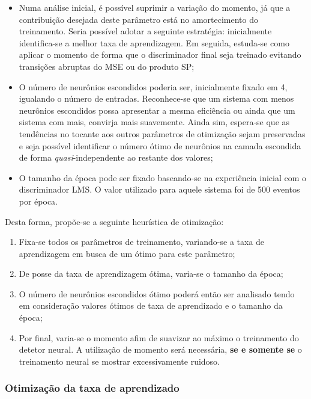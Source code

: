 \begin{itemize}
\item Numa análise inicial, é possível suprimir a variação do momento, já que
a contribuição desejada deste parâmetro está no amortecimento do
treinamento. Seria possível adotar a seguinte estratégia: inicialmente
identifica-se a melhor taxa de aprendizagem. Em seguida, estuda-se como
aplicar o momento de forma que o discriminador final seja treinado evitando
transições abruptas do MSE ou do produto SP;

\item O número de neurônios escondidos poderia ser, inicialmente fixado em 4,
igualando o número de entradas. Reconhece-se que um sistema com menos
neurônios escondidos possa apresentar a mesma eficiência ou ainda que um
sistema com mais, convirja mais suavemente. Ainda sim, espera-se que as
tendências no tocante aos outros parâmetros de otimização sejam preservadas e
seja possível identificar o número ótimo de neurônios na camada escondida de
forma \textit{quasi}-independente ao restante dos valores;

\item O tamanho da época pode ser fixado baseando-se na experiência inicial
com o discriminador LMS. O valor utilizado para aquele sistema foi de 500
eventos por época.
\end{itemize}

Desta forma, propõe-se a seguinte heurística de otimização:

\begin{enumerate}
\item Fixa-se todos os parâmetros de treinamento, variando-se a taxa de
aprendizagem em busca de um ótimo para este parâmetro;
\item De posse da taxa de aprendizagem ótima, varia-se o tamanho da época;
\item O número de neurônios escondidos ótimo poderá então ser analisado tendo
em consideração valores ótimos de taxa de aprendizado e o tamanho da época;
\item Por final, varia-se o momento afim de suavizar ao máximo o treinamento
do detetor neural. A utilização de momento será necessária, \textbf{se e
somente se} o treinamento neural se mostrar excessivamente ruidoso.
\end{enumerate}

\subsubsection{Otimização da taxa de aprendizado}

